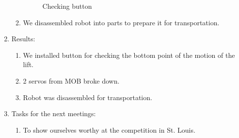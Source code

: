 \begin{enumerate}
\begin{enumerate}
\begin{figure}[H]
\begin{minipage}[h]{0.31\linewidth}
			\end{minipage}
			\caption{Checking button}
		\end{figure}
		
		
        \item We disassembled robot into parts to prepare it for transportation.

	\end{enumerate}
	
	\item Results:
	\begin{enumerate}
		
		\item We installed button for checking the bottom point of the motion of the lift.
		
		\item 2 servos from MOB broke down.
		
        \item Robot was disassembled for transportation.
		
	\end{enumerate}
	
	\item Tasks for the next meetings:
	\begin{enumerate}
		
		\item To show ourselves worthy at the competition in St. Louis.
			
	\end{enumerate}
\end{enumerate}
\fillpage

